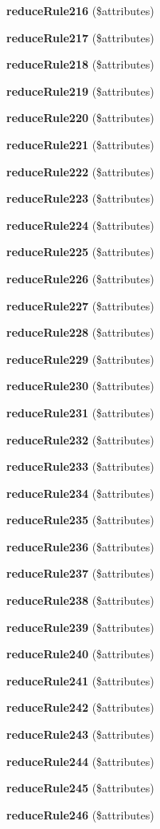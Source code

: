 \begin{DoxyCompactItemize}
\item 
{\bf reduce\+Rule216} (\$attributes)
\item 
{\bf reduce\+Rule217} (\$attributes)
\item 
{\bf reduce\+Rule218} (\$attributes)
\item 
{\bf reduce\+Rule219} (\$attributes)
\item 
{\bf reduce\+Rule220} (\$attributes)
\item 
{\bf reduce\+Rule221} (\$attributes)
\item 
{\bf reduce\+Rule222} (\$attributes)
\item 
{\bf reduce\+Rule223} (\$attributes)
\item 
{\bf reduce\+Rule224} (\$attributes)
\item 
{\bf reduce\+Rule225} (\$attributes)
\item 
{\bf reduce\+Rule226} (\$attributes)
\item 
{\bf reduce\+Rule227} (\$attributes)
\item 
{\bf reduce\+Rule228} (\$attributes)
\item 
{\bf reduce\+Rule229} (\$attributes)
\item 
{\bf reduce\+Rule230} (\$attributes)
\item 
{\bf reduce\+Rule231} (\$attributes)
\item 
{\bf reduce\+Rule232} (\$attributes)
\item 
{\bf reduce\+Rule233} (\$attributes)
\item 
{\bf reduce\+Rule234} (\$attributes)
\item 
{\bf reduce\+Rule235} (\$attributes)
\item 
{\bf reduce\+Rule236} (\$attributes)
\item 
{\bf reduce\+Rule237} (\$attributes)
\item 
{\bf reduce\+Rule238} (\$attributes)
\item 
{\bf reduce\+Rule239} (\$attributes)
\item 
{\bf reduce\+Rule240} (\$attributes)
\item 
{\bf reduce\+Rule241} (\$attributes)
\item 
{\bf reduce\+Rule242} (\$attributes)
\item 
{\bf reduce\+Rule243} (\$attributes)
\item 
{\bf reduce\+Rule244} (\$attributes)
\item 
{\bf reduce\+Rule245} (\$attributes)
\item 
{\bf reduce\+Rule246} (\$attributes)

\end{DoxyCompactItemize}
